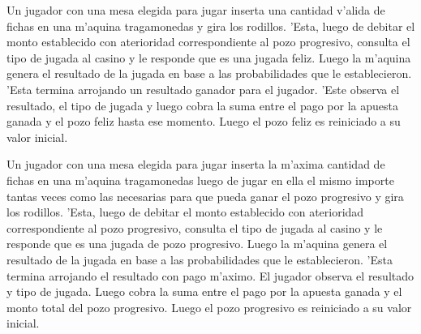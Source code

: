 \escenario
{
Un jugador con una mesa elegida para jugar inserta una cantidad v'alida de fichas en una m'aquina tragamonedas y gira los rodillos. 'Esta, luego de debitar el monto establecido con aterioridad correspondiente al pozo progresivo, consulta el tipo de jugada al casino y le responde que es una jugada feliz. Luego la m'aquina genera el resultado de la jugada en base a las probabilidades que le establecieron. 'Esta termina arrojando un resultado ganador para el jugador. 'Este observa el resultado, el tipo de jugada y luego cobra la suma entre el pago por la apuesta ganada y el pozo feliz hasta ese momento. Luego el pozo feliz es reiniciado a su valor inicial. 
}

\escenario
{
Un jugador con una mesa elegida para jugar inserta la m'axima cantidad de fichas en una m'aquina tragamonedas luego de jugar en ella el mismo importe tantas veces como las necesarias para que pueda ganar el pozo progresivo y gira los rodillos. 'Esta, luego de debitar el monto establecido con aterioridad correspondiente al pozo progresivo, consulta el tipo de jugada al casino y le responde que es una jugada de pozo progresivo. Luego la m'aquina genera el resultado de la jugada en base a las probabilidades que le establecieron. 'Esta termina arrojando el resultado con pago m'aximo. El jugador observa el resultado y tipo de jugada. Luego cobra la suma entre el pago por la apuesta ganada y el monto total del pozo progresivo. Luego el pozo progresivo es reiniciado a su valor inicial.
}
